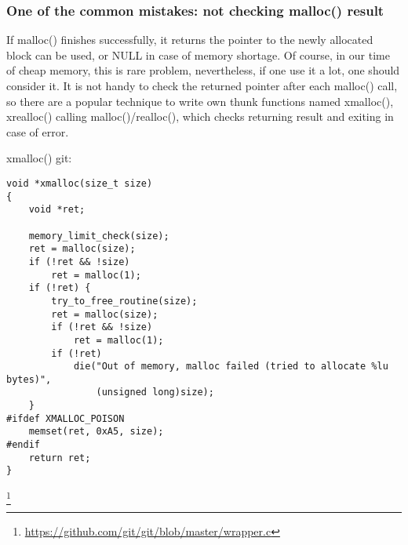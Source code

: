 
\subsubsection{
{One of the common mistakes: not checking malloc() result}}

{If malloc() finishes successfully, it returns the pointer to the newly allocated block can be used,
or NULL in case of memory shortage}.
{Of course, in our time of cheap memory, this is rare problem, nevertheless, if one use it a lot,
one should consider it}.
{It is not handy to check the returned pointer after each malloc() call, so there are a popular technique
to write own thunk functions named xmalloc(), xrealloc() calling malloc()/realloc(), which checks
returning result and exiting in case of error}.

 xmalloc()  git:

\begin{lstlisting}
void *xmalloc(size_t size)
{
	void *ret;

	memory_limit_check(size);
	ret = malloc(size);
	if (!ret && !size)
		ret = malloc(1);
	if (!ret) {
		try_to_free_routine(size);
		ret = malloc(size);
		if (!ret && !size)
			ret = malloc(1);
		if (!ret)
			die("Out of memory, malloc failed (tried to allocate %lu bytes)",
			    (unsigned long)size);
	}
#ifdef XMALLOC_POISON
	memset(ret, 0xA5, size);
#endif
	return ret;
}
\end{lstlisting}
\footnote{\url{https://github.com/git/git/blob/master/wrapper.c}}


